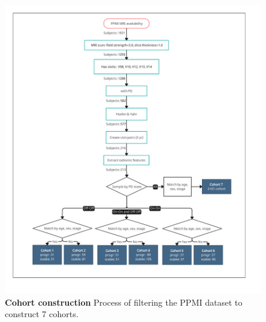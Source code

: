 \begin{figure}[!ht]
  \centering
  \includegraphics[width=\linewidth]{images/cohort_flowhart.pdf}
  \caption{{\bf Cohort construction} Process of filtering the PPMI dataset to construct 7 cohorts.}
  \label{cohortCreationFlowchart}
\end{figure}
